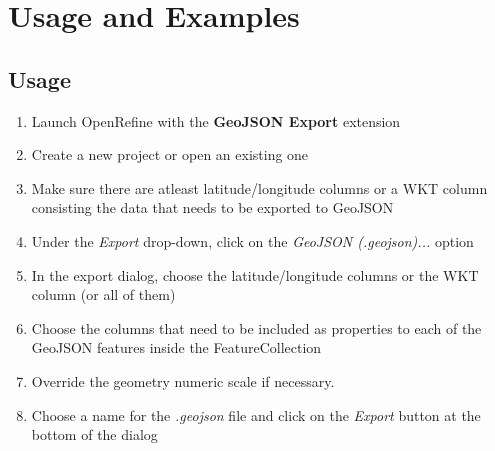 \section{Usage and Examples}
\subsection{Usage}
\begin{enumerate}
    \item Launch OpenRefine with the \textbf{GeoJSON Export} extension
    \item Create a new project or open an existing one
    \item Make sure there are atleast latitude/longitude columns or a WKT column consisting the data that needs to be exported to GeoJSON
    \item Under the \textit{Export} drop-down, click on the \textit{GeoJSON (.geojson)...} option
    \item In the export dialog, choose the latitude/longitude columns or the WKT column (or all of them)
    \item Choose the columns that need to be included as properties to each of the GeoJSON features inside the FeatureCollection
    \item Override the geometry numeric scale if necessary.
    \item Choose a name for the \textit{.geojson} file and click on the \textit{Export} button at the bottom of the dialog
\end{enumerate}
